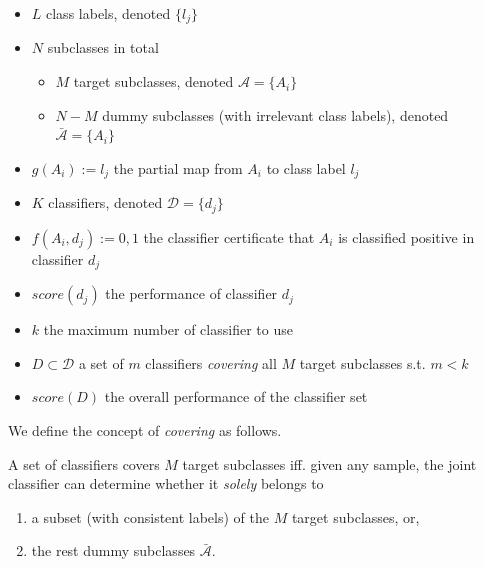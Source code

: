 \documentclass[acmsmall,nonacm]{acmart}\settopmatter{}
\begin{document}
\newpage
\begin{itemize}
	\item $L$ class labels, denoted $\{l_j\}$
	\item $N$ subclasses in total \begin{itemize}
		\item $M$ target subclasses, denoted $\mathcal{A} = \{A_i\}$
		\item $N-M$ dummy subclasses (with irrelevant class labels), denoted $\bar{\mathcal{A}} = \{A_i\}$
	\end{itemize}
	\item $g(A_i) := l_j$ the partial map from $A_i$ to class label $l_j$
	\item $K$ classifiers, denoted $\mathcal{D} = \{d_j\}$
	\item $f(A_i, d_j) := 0, 1$ the classifier certificate that $A_i$ is classified positive in classifier $d_j$
	\item $score(d_j)$ the performance of classifier $d_j$
	\item $k$ the maximum number of classifier to use
\end{itemize}

\begin{itemize}
	\item $D \subset \mathcal{D}$ a set of $m$ classifiers \textit{covering} all $M$ target subclasses s.t. $m < k$
	\item $score(D)$ the overall performance of the classifier set
\end{itemize}

We define the concept of \textit{covering} as follows.
\begin{definition}
	A set of classifiers covers $M$ target subclasses iff. given any sample, the joint classifier can determine whether it \textit{solely} belongs to \begin{enumerate}
		\item a subset (with consistent labels) of the $M$ target subclasses, or,
		\item the rest dummy subclasses $\bar{\mathcal{A}}$.
	\end{enumerate}
\end{definition}

\end{document}

